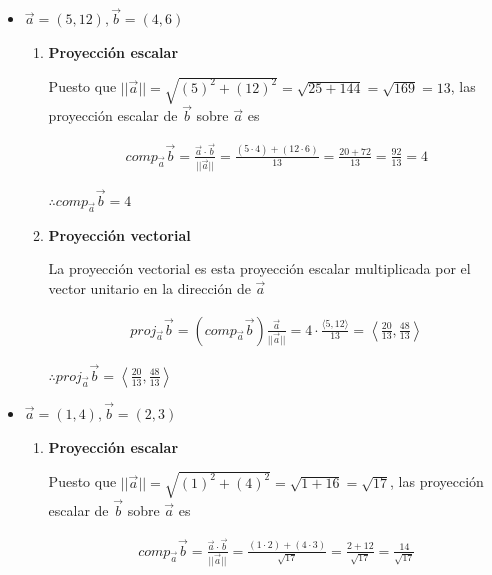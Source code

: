 \documentclass[12pt]{article}
\begin{document}
\begin{itemize}
  
\item $\vec{a}= (5,12), \vec{b}=(4,6)$

  \begin{enumerate}[format=\textbf]

  \item \textbf{Proyección escalar}

    Puesto que $||\vec{a}|| = \sqrt{(5)^2 + (12)^2} = \sqrt{25 + 144} = \sqrt{169} = 13$, las proyección escalar de $\vec{b}$ sobre $\vec{a}$ es

    \begin{align*}
      comp_{\vec{a}}\vec{b}
      = \frac{\vec{a} \cdot \vec{b}}{||\vec{a}||}
      = \frac{(5 \cdot 4) + (12 \cdot 6)}{13}
      = \frac{20 + 72}{13}
      = \frac{92}{13}
      = 4
    \end{align*}

    $\therefore comp_{\vec{a}}\vec{b} = 4$

  \item \textbf{Proyección vectorial}

    La proyección vectorial es esta proyección escalar multiplicada por el vector unitario en la dirección de $\vec{a}$

    \begin{align*}
      proj_{\vec{a}}\vec{b}
      = \left( comp_{\vec{a}}\vec{b} \right) \frac{\vec{a}}{||\vec{a}||}
      = 4 \cdot \frac{\langle 5, 12 \rangle}{13}
      = \left\langle \frac{20}{13}, \frac{48}{13} \right\rangle
    \end{align*}

    $\therefore proj_{\vec{a}}\vec{b} = \left\langle \frac{20}{13}, \frac{48}{13} \right\rangle$
    
  \end{enumerate}
  
\item $\vec{a}= (1,4), \vec{b}=(2,3)$

  \begin{enumerate}[format=\textbf]

  \item \textbf{Proyección escalar}

    Puesto que $||\vec{a}|| = \sqrt{(1)^2 + (4)^2} = \sqrt{1 + 16} = \sqrt{17}$, las proyección escalar de $\vec{b}$ sobre $\vec{a}$ es

    \begin{align*}
      comp_{\vec{a}}\vec{b}
      = \frac{\vec{a} \cdot \vec{b}}{||\vec{a}||}
      = \frac{(1 \cdot 2) + (4 \cdot 3)}{\sqrt{17}}
      = \frac{2 + 12}{\sqrt{17}}
      = \frac{14}{\sqrt{17}}
    \end{align*}


\end{enumerate}
\end{itemize}
\end{document}
